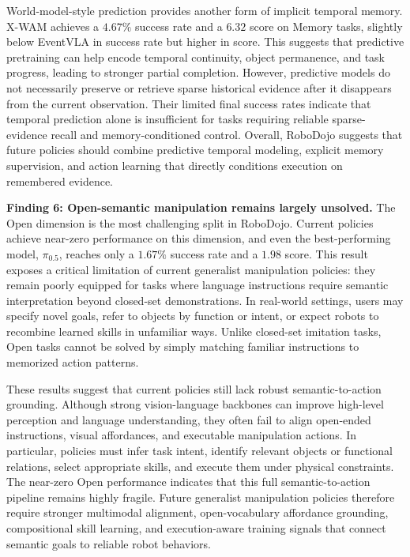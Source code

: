 World-model-style prediction provides another form of implicit temporal memory. X-WAM achieves a $4.67\%$ success rate and a $6.32$ score on Memory tasks, slightly below EventVLA in success rate but higher in score. This suggests that predictive pretraining can help encode temporal continuity, object permanence, and task progress, leading to stronger partial completion. However, predictive models do not necessarily preserve or retrieve sparse historical evidence after it disappears from the current observation. Their limited final success rates indicate that temporal prediction alone is insufficient for tasks requiring reliable sparse-evidence recall and memory-conditioned control. Overall, RoboDojo suggests that future policies should combine predictive temporal modeling, explicit memory supervision, and action learning that directly conditions execution on remembered evidence.

\textcolor{Blue_1}{\textbf{Finding 6: Open-semantic manipulation remains largely unsolved.}}
The Open dimension is the most challenging split in RoboDojo. Current policies achieve near-zero performance on this dimension, and even the best-performing model, $\pi_{0.5}$, reaches only a $1.67\%$ success rate and a $1.98$ score. This result exposes a critical limitation of current generalist manipulation policies: they remain poorly equipped for tasks where language instructions require semantic interpretation beyond closed-set demonstrations. In real-world settings, users may specify novel goals, refer to objects by function or intent, or expect robots to recombine learned skills in unfamiliar ways. Unlike closed-set imitation tasks, Open tasks cannot be solved by simply matching familiar instructions to memorized action patterns.

These results suggest that current policies still lack robust semantic-to-action grounding. Although strong vision-language backbones can improve high-level perception and language understanding, they often fail to align open-ended instructions, visual affordances, and executable manipulation actions. In particular, policies must infer task intent, identify relevant objects or functional relations, select appropriate skills, and execute them under physical constraints. The near-zero Open performance indicates that this full semantic-to-action pipeline remains highly fragile. Future generalist manipulation policies therefore require stronger multimodal alignment, open-vocabulary affordance grounding, compositional skill learning, and execution-aware training signals that connect semantic goals to reliable robot behaviors.

